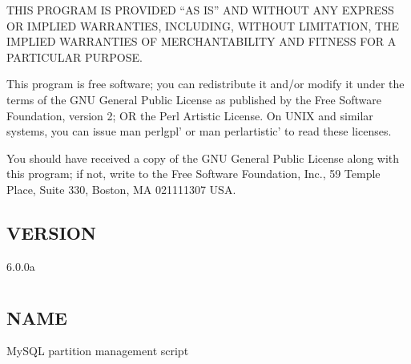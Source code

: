 \documentclass[letterpaper,10pt,english]{sphinxmanual}
\begin{document}
\sphinxAtStartPar
THIS PROGRAM IS PROVIDED “AS IS” AND WITHOUT ANY EXPRESS OR IMPLIED
WARRANTIES, INCLUDING, WITHOUT LIMITATION, THE IMPLIED WARRANTIES OF
MERCHANTABILITY AND FITNESS FOR A PARTICULAR PURPOSE.

\sphinxAtStartPar
This program is free software; you can redistribute it and/or modify it under
the terms of the GNU General Public License as published by the Free Software
Foundation, version 2; OR the Perl Artistic License.  On UNIX and similar
systems, you can issue \textasciigrave{}man perlgpl’ or \textasciigrave{}man perlartistic’ to read these
licenses.

\sphinxAtStartPar
You should have received a copy of the GNU General Public License along with
this program; if not, write to the Free Software Foundation, Inc., 59 Temple
Place, Suite 330, Boston, MA  02111\sphinxhyphen{}1307  USA.


\section{VERSION}
\label{\detokenize{mariadb-kill:version}}
\sphinxAtStartPar
{} 6.0.0a


\chapter{}
\label{\detokenize{mariadb-parted:mariadb-parted}}\label{\detokenize{mariadb-parted::doc}}

\section{NAME}
\label{\detokenize{mariadb-parted:name}}
\sphinxAtStartPar
{} \sphinxhyphen{} MySQL partition management script
\end{document}
